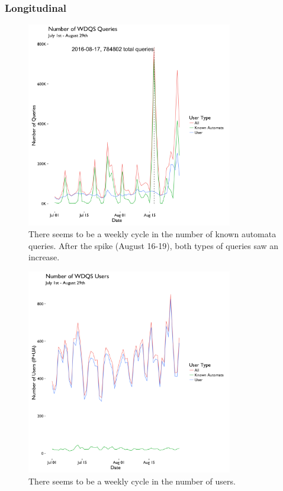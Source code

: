\documentclass[12pt,]{article}
\begin{document}
\subsubsection{Longitudinal}\label{longitudinal}

\begin{figure}[H]
\centering
\includegraphics[width=9cm,height=9cm,keepaspectratio]{figures/all_query_ts.png}
\caption{There seems to be a weekly cycle in the number of known automata
queries. After the spike (August 16-19), both types of queries saw an
increase.}
\end{figure}

\begin{figure}[H]
\centering
\includegraphics[width=9cm,height=9cm,keepaspectratio]{figures/all_user_ts.png}
\caption{There seems to be a weekly cycle in the number of users.}
\end{figure}
\end{document}
